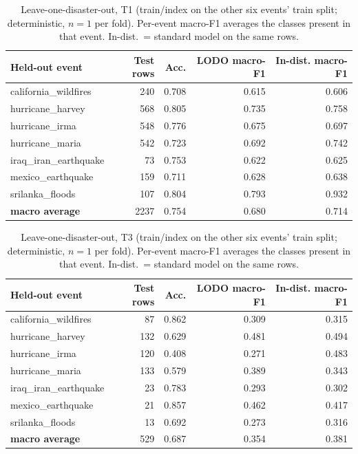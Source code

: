 \begin{table}[t]
\centering
\footnotesize
\caption{Leave-one-disaster-out, T1 (train/index on the other six events' train split; deterministic, $n=1$ per fold). Per-event macro-F1 averages the classes present in that event. In-dist.\ = standard model on the same rows.}
\label{tab:c2_t1}
\begin{tabular}{lrrrr}
\toprule
Held-out event & Test rows & Acc. & LODO macro-F1 & In-dist. macro-F1 \\
\midrule
california\_wildfires & 240 & 0.708 & 0.615 & 0.606 \\
hurricane\_harvey & 568 & 0.805 & 0.735 & 0.758 \\
hurricane\_irma & 548 & 0.776 & 0.675 & 0.697 \\
hurricane\_maria & 542 & 0.723 & 0.692 & 0.742 \\
iraq\_iran\_earthquake & 73 & 0.753 & 0.622 & 0.625 \\
mexico\_earthquake & 159 & 0.711 & 0.628 & 0.638 \\
srilanka\_floods & 107 & 0.804 & 0.793 & 0.932 \\
\textbf{macro average} & 2237 & 0.754 & 0.680 & 0.714 \\
\bottomrule
\end{tabular}
\end{table}


\begin{table}[t]
\centering
\footnotesize
\caption{Leave-one-disaster-out, T3 (train/index on the other six events' train split; deterministic, $n=1$ per fold). Per-event macro-F1 averages the classes present in that event. In-dist.\ = standard model on the same rows.}
\label{tab:c2_t3}
\begin{tabular}{lrrrr}
\toprule
Held-out event & Test rows & Acc. & LODO macro-F1 & In-dist. macro-F1 \\
\midrule
california\_wildfires & 87 & 0.862 & 0.309 & 0.315 \\
hurricane\_harvey & 132 & 0.629 & 0.481 & 0.494 \\
hurricane\_irma & 120 & 0.408 & 0.271 & 0.483 \\
hurricane\_maria & 133 & 0.579 & 0.389 & 0.343 \\
iraq\_iran\_earthquake & 23 & 0.783 & 0.293 & 0.302 \\
mexico\_earthquake & 21 & 0.857 & 0.462 & 0.417 \\
srilanka\_floods & 13 & 0.692 & 0.273 & 0.316 \\
\textbf{macro average} & 529 & 0.687 & 0.354 & 0.381 \\
\bottomrule
\end{tabular}
\end{table}

